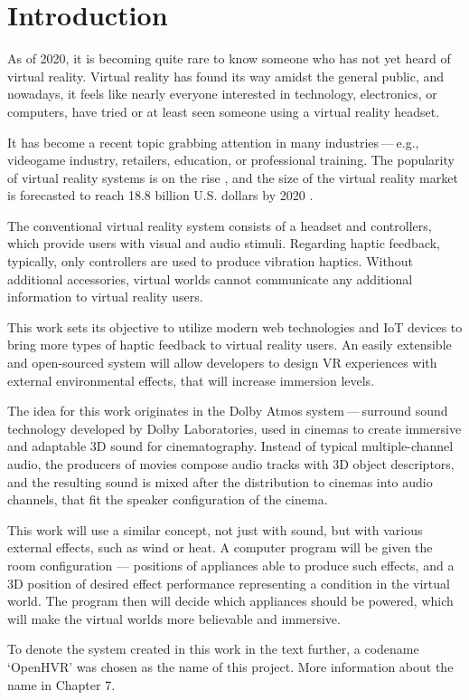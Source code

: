 \chapter{Introduction}

\vspace{6em}

As of 2020, it is becoming quite rare to know someone who has not yet heard
of virtual reality. Virtual reality has found its way amidst the general public,
and nowadays, it feels like nearly everyone interested in technology,
electronics, or computers, have tried or at least seen someone using a virtual
reality headset.

It has become a recent topic grabbing attention in many industries — e.g.,
videogame industry, retailers, education, or professional training. The popularity
of virtual reality systems is on the rise \cite{shipments}, and the size
of the virtual reality market is forecasted to reach 18.8 billion U.S. dollars
by 2020 \cite{vrmsize}.

The conventional virtual reality system consists of a headset and controllers,
which provide users with visual and audio stimuli. Regarding haptic feedback,
typically, only controllers are used to produce vibration haptics. Without
additional accessories, virtual worlds cannot communicate any additional
information to virtual reality users.

This work sets its objective to utilize modern web technologies and IoT
devices to bring more types of haptic feedback to virtual reality users.
An easily extensible and open-sourced system will allow developers to design
VR experiences with external environmental effects, that will increase
immersion levels.

The idea for this work originates in the Dolby Atmos system — surround sound
technology developed by Dolby Laboratories, used in cinemas to create
immersive and adaptable 3D sound for cinematography. Instead of typical
multiple-channel audio, the producers of movies compose audio tracks with
3D object descriptors, and the resulting sound is mixed after the distribution
to cinemas into audio channels, that fit the speaker configuration
of the cinema.\cite{dawp}

This work will use a similar concept, not just with sound, but with various
external effects, such as wind or heat. A computer program will be given
the room configuration — positions of appliances able to produce such effects,
and a 3D position of desired effect performance representing a condition
in the virtual world. The program then will decide which appliances should
be powered, which will make the virtual worlds more believable and immersive.

To denote the system created in this work in the text further, a codename
`OpenHVR' was chosen as the name of this project. More information about
the name in Chapter 7.

